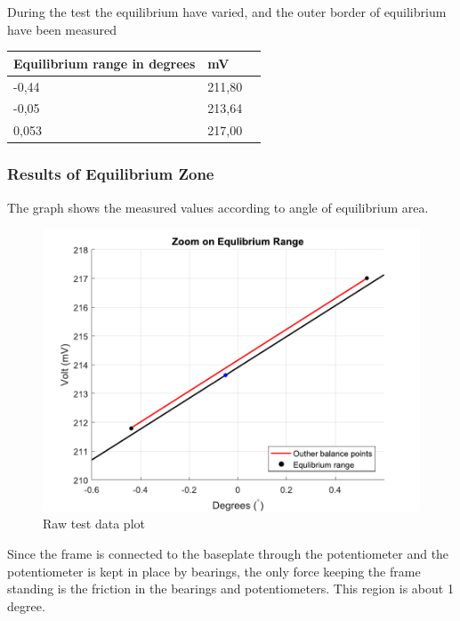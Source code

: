 During the test the equilibrium have varied, and the outer border of equilibrium have been measured 

\begin{table}[H]
	\begin{tabular}{|l|l|p{4.3cm}|}
		\hline%
		\textbf{Equilibrium range in degrees}       &  \textbf{mV}         \\
		\hline%
		-0,44                               			  & 211,80               \\
		\hline%
		-0,05                                          & 213,64               \\
		\hline%
		0,053 										  & 217,00              \\
		\hline%
	\end{tabular}
\end{table}

\subsubsection{Results of Equilibrium Zone}
The graph shows the measured values according to angle of equilibrium area.
\begin{figure}[H] 
	\centering 
	\includegraphics[scale=0.7]{figures/linearityOfPotmeterTest2-2}
	\caption{Raw test data plot}
	\label{linearityOfPotmeterTest2-2}
\end{figure}
Since the frame is connected to the baseplate through the potentiometer and the potentiometer is kept in place by bearings, the only force keeping the frame standing is the friction in the bearings and potentiometers. This region is about 1 degree.


